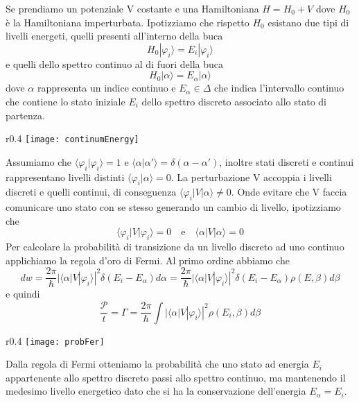 Se prendiamo un potenziale V costante e una Hamiltoniana $H = H_0+V$ dove $H_0$ \`e la Hamiltoniana imperturbata. Ipotizziamo che rispetto $H_0$ esistano due tipi di livelli energeti, quelli presenti all'interno della buca 
\begin{equation*}
	H_0|\varphi_i \rangle = E_i|\varphi_i \rangle
\end{equation*}
e quelli dello spettro continuo al di fuori della buca 
\begin{equation*}
	H_0 | \alpha \rangle = E_{\alpha}|\alpha \rangle
\end{equation*}
dove $\alpha $ rappresenta un indice continuo e $E_{\alpha} \in \Delta $ che indica l'intervallo continuo che contiene lo stato iniziale $E_i$ dello spettro discreto associato allo stato di partenza.

\begin{wrapfigure}{r}{0.4\textwidth}
    \centering
    \texttt{[image: continumEnergy]} %
\end{wrapfigure}
Assumiamo che $\langle \varphi_i |\varphi_i \rangle = 1$ e $\langle \alpha |\alpha' \rangle = \delta(\alpha - \alpha')$, inoltre stati discreti e continui rappresentano livelli distinti $\langle \varphi_i |\alpha \rangle = 0$. La perturbazione V accoppia i livelli discreti e quelli continui, di conseguenza $\langle \varphi_i |V|\alpha \rangle \neq 0$. Onde evitare che V faccia comunicare uno stato con se stesso generando un cambio di livello, ipotizziamo che 
\begin{equation*}
	\langle \varphi_i |V|\varphi_i \rangle = 0 \quad \text{e} \quad \langle \alpha |V|\alpha \rangle = 0
\end{equation*}
Per calcolare la probabilit\`a di transizione da un livello discreto ad uno continuo applichiamo la regola d'oro di Fermi. Al primo ordine abbiamo che
\begin{equation*}
	dw = \frac{2 \pi}{\hbar} |\langle \alpha|V|\varphi_i \rangle|^2\delta(E_i-E_\alpha)d\alpha = \frac{2 \pi}{\hbar} |\langle \alpha|V|\varphi_i \rangle|^2\delta(E_i-E_\alpha)\rho(E,\beta)d\beta 
\end{equation*}
e quindi
\begin{equation*}
	\frac{\mathcal{P}}{t} = \Gamma = \frac{2 \pi}{\hbar} \int |\langle \alpha|V|\varphi_i \rangle|^2 \rho(E_i,\beta)d\beta
\end{equation*}
\begin{wrapfigure}{r}{0.4\textwidth}
    \centering
    \texttt{[image: probFer]} %
\end{wrapfigure}
Dalla regola di Fermi otteniamo la probabilit\`a che uno stato ad energia $E_i$ appartenente allo spettro discreto passi allo spettro continuo, ma mantenendo il medesimo livello energetico dato che si ha la conservazione dell'energia $E_{\alpha} = E_i$.

